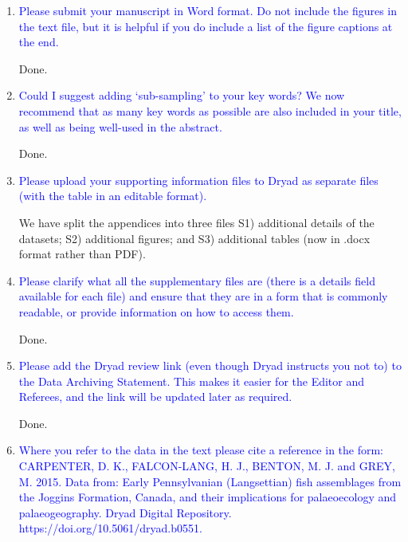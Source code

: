 \documentclass[12pt,letterpaper]{article}
\begin{document}
\begin{enumerate}

\item{\textcolor{blue}{Please submit your manuscript in Word format. Do not include the figures in the text file, but it is helpful if you do include a list of the figure captions at the end.}}

Done.

\item{\textcolor{blue}{Could I suggest adding ‘sub-sampling’ to your key words? We now recommend that as many key words as possible are also included in your title, as well as being well-used in the abstract.}}

Done.

\item{\textcolor{blue}{Please upload your supporting information files to Dryad as separate files (with the table in an editable format).}}

We have split the appendices into three files S1) additional details of the datasets; S2) additional figures; and S3) additional tables (now in .docx format rather than PDF).

\item{\textcolor{blue}{Please clarify what all the supplementary files are (there is a details field available for each file) and ensure that they are in a form that is commonly readable, or provide information on how to access them.}}

Done. 

\item{\textcolor{blue}{Please add the Dryad review link (even though Dryad instructs you not to) to the Data Archiving Statement. This makes it easier for the Editor and Referees, and the link will be updated later as required.}}

Done.

\item{\textcolor{blue}{Where you refer to the data in the text please cite a reference in the form: CARPENTER, D. K., FALCON-LANG, H. J., BENTON, M. J. and GREY, M. 2015. Data
from: Early Pennsylvanian (Langsettian) fish assemblages from the Joggins
Formation, Canada, and their implications for palaeoecology and palaeogeography.
Dryad Digital Repository. https://doi.org/10.5061/dryad.b0551.}}

\end{enumerate}
\end{document}
